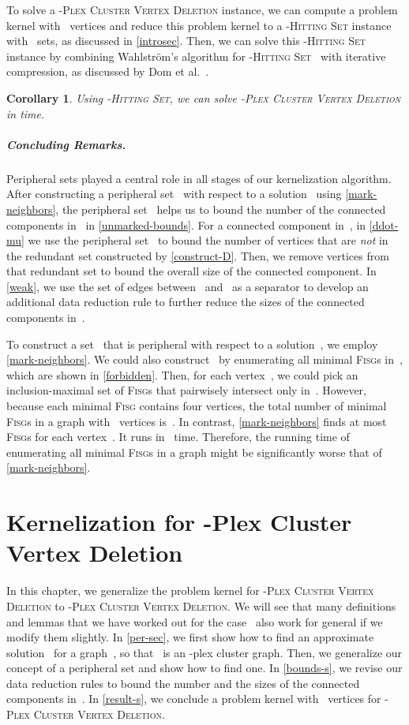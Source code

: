 \documentclass[12pt, a4paper, abstracton]{scrreprt}
\renewcommand{\cite}{~\citep}
\newcommand{\name}{\textsc}
\newcommand{\pvd}[1]{\name{\mbox{-Plex} Cluster Vertex Deletion}}
\newcommand{\hs}[1]{\name{\mbox{-Hitting} Set}}
\newcommand{\pl}[1]{\mbox{-plex}}
\newcommand{\pcg}[1]{\pl #1 cluster graph}
\newcommand{\FISG}{\textsc{Fisg}}
\newcounter{theorem}
\newtheorem{korollar}{Corollary}[chapter]
\theoremstyle{definition}
\theoremstyle{remark}
\begin{document}
\noindent To solve a \pvd 2 instance, we can compute a problem kernel with~ vertices and reduce this problem kernel to a \hs 4 instance with~ sets, as discussed in \autoref{introsec}. Then, we can solve this \hs 4 instance by combining Wahlström's algorithm for \hs 3\cite{Wah07} with iterative compression, as discussed by Dom et al.\cite{DGHNT09}.

\begin{korollar}\label{interleave}
Using \hs 4, we can solve \pvd 2 in  time.
\end{korollar}

\paragraph{Concluding Remarks.} Peripheral sets played a central role in all stages of our kernelization algorithm. After constructing a peripheral set~ with respect to a solution~ using \autoref{mark-neighbors}, the peripheral set~ helps us to bound the number of the connected components in~ in \autoref{unmarked-bounds}. For a connected component in~, in \autoref{ddot-mu} we use the peripheral set~ to bound the number of vertices that are \emph{not} in the redundant set constructed by \autoref{construct-D}. Then, we remove vertices from that redundant set to bound the overall size of the connected component. In \autoref{weak}, we use the set of edges between~ and~ as a separator to develop an additional data reduction rule to further reduce the sizes of the connected components in~.

To construct a set~ that is peripheral with respect to a solution~, we employ \autoref{mark-neighbors}. We could also construct~ by enumerating all minimal \FISG{}s in~, which are shown in \autoref{forbidden}. Then, for each vertex~, we could pick an inclusion-maximal set of \FISG{}s that pairwisely intersect only in~. However, because each minimal \FISG{} contains four vertices, the total number of minimal \FISG{}s in a graph with~ vertices is~. In contrast, \autoref{mark-neighbors} finds at most~ \FISG{}s for each vertex~. It runs in~ time. Therefore, the running time of enumerating all minimal \FISG{}s in a graph might be significantly worse that of \autoref{mark-neighbors}.

\chapter[Kernelization for \pvd s]{Kernelization for \boldmath-Plex Cluster Vertex Deletion}
In this chapter, we generalize the problem kernel for \pvd 2 to \pvd s. We will see that many definitions and lemmas that we have worked out for the case~ also work for general  if we modify them slightly. In \autoref{per-sec}, we first show how to find an approximate solution~ for a graph~, so that~ is an \pcg s. Then, we generalize our concept of a peripheral set and show how to find one. In \autoref{bounds-s}, we revise our data reduction rules to bound the number and the sizes of the connected components in~.  In \autoref{result-s}, we conclude a problem kernel with~ vertices for \pvd s.
\end{document}
